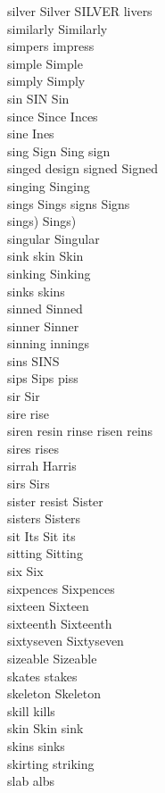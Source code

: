 silver Silver SILVER livers\\
similarly Similarly\\
simpers impress\\
simple Simple\\
simply Simply\\
sin SIN Sin\\
since Since Inces\\
sine Ines\\
sing Sign Sing sign\\
singed design signed Signed\\
singing Singing\\
sings Sings signs Signs\\
sings) Sings)\\
singular Singular\\
sink skin Skin\\
sinking Sinking\\
sinks skins\\
sinned Sinned\\
sinner Sinner\\
sinning innings\\
sins SINS\\
sips Sips piss\\
sir Sir\\
sire rise\\
siren resin rinse risen reins\\
sires rises\\
sirrah Harris\\
sirs Sirs\\
sister resist Sister\\
sisters Sisters\\
sit Its Sit its\\
sitting Sitting\\
six Six\\
sixpences Sixpences\\
sixteen Sixteen\\
sixteenth Sixteenth\\
sixtyseven Sixtyseven\\
sizeable Sizeable\\
skates stakes\\
skeleton Skeleton\\
skill kills\\
skin Skin sink\\
skins sinks\\
skirting striking\\
slab albs\\
